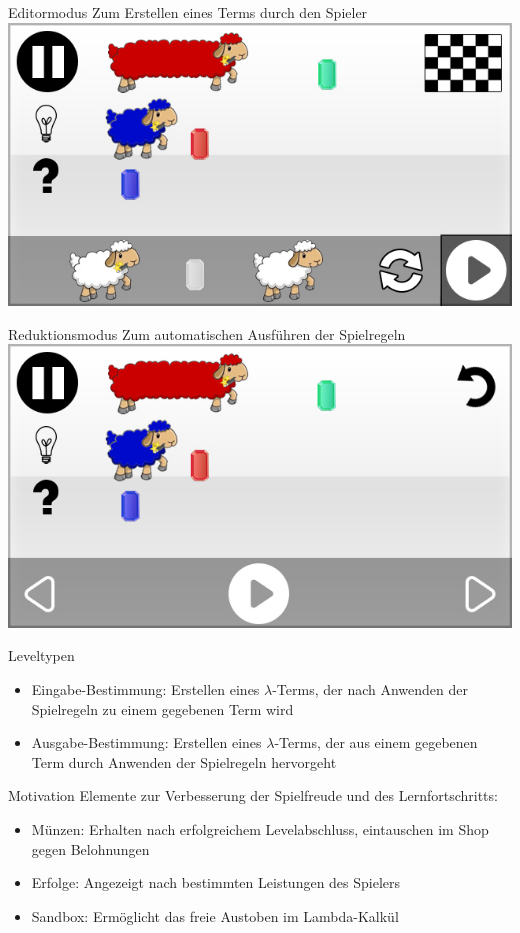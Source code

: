 \documentclass[18pt]{beamer}
\begin{document}
\begin{frame}{Editormodus}
	Zum Erstellen eines Terms durch den Spieler
	\includegraphics[scale=0.5]{../gui/_jpeg/game}
\end{frame}

\begin{frame}{Reduktionsmodus}
	Zum automatischen Ausführen der Spielregeln
	\includegraphics[scale=0.5]{../gui/_jpeg/game_play_started}
\end{frame}

\begin{frame}{Leveltypen}
	\begin{itemize}
	\item Eingabe-Bestimmung: Erstellen eines $\lambda$-Terms, der nach Anwenden der Spielregeln zu einem gegebenen Term wird
	\item Ausgabe-Bestimmung: Erstellen eines $\lambda$-Terms, der aus einem gegebenen Term durch Anwenden der Spielregeln hervorgeht
	\end{itemize}
\end{frame}

\begin{frame}{Motivation}
	Elemente zur Verbesserung der Spielfreude und des Lernfortschritts:
	\begin{itemize}[<+->]
	\item Münzen: Erhalten nach erfolgreichem Levelabschluss, eintauschen im Shop gegen Belohnungen
	\item Erfolge: Angezeigt nach bestimmten Leistungen des Spielers
	\item Sandbox: Ermöglicht das freie Austoben im Lambda-Kalkül
	\end{itemize}
\end{frame}
\end{document}
